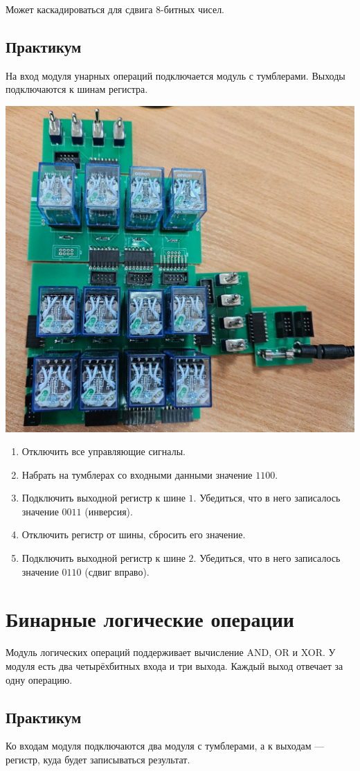 \documentclass{book}
\begin{document}
Может каскадироваться для сдвига $8$-битных чисел.

\subsection{Практикум}

На вход модуля унарных операций подключается модуль с тумблерами.
Выходы подключаются к шинам регистра.


\includegraphics[width=0.5\columnwidth]{photo/unary.jpg}

\begin{enumerate}
    \item Отключить все управляющие сигналы.
    \item Набрать на тумблерах со входными данными значение $1100$.
    \item Подключить выходной регистр к шине $1$. Убедиться, что в него записалось значение $0011$ (инверсия).
    \item Отключить регистр от шины, сбросить его значение.
    \item Подключить выходной регистр к шине $2$. Убедиться, что в него записалось значение $0110$ (сдвиг вправо).
\end{enumerate}

\section{Бинарные логические операции}

Модуль логических операций поддерживает вычисление AND, OR и XOR.
У модуля есть два четырёхбитных входа и три выхода.
Каждый выход отвечает за одну операцию.

\subsection{Практикум}

Ко входам модуля подключаются два модуля с тумблерами, а к выходам --- регистр,
куда будет записываться результат.
\end{document}
